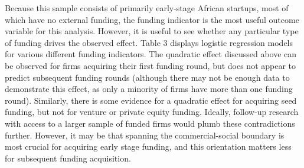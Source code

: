 \documentclass[12pt]{article}
\begin{document}
\clearpage

Because this sample consists of primarily early-stage African startups, most of which have no external funding, the funding indicator is the most useful outcome variable for this analysis. However, it is useful to see whether any particular type of funding drives the observed effect. Table 3 displays logistic regression models for various different funding indicators. The quadratic effect discussed above can be observed for firms acquiring their first funding round, but does not appear to predict subsequent funding rounds (although there may not be enough data to demonstrate this effect, as only a minority of firms have more than one funding round). Similarly, there is some evidence for a quadratic effect for acquiring seed funding, but not for venture or private equity funding. Ideally, follow-up research with access to a larger sample of funded firms would plumb these contradictions further. However, it may be that spanning the commercial-social boundary is most crucial for acquiring early stage funding, and this orientation matters less for subsequent funding acquisition. 
\end{document}

